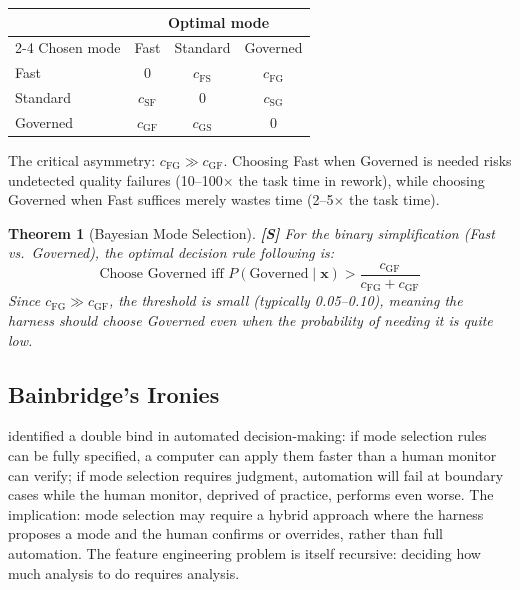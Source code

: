 \documentclass[11pt, a4paper, copyright]{googledeepmind}
\newtheorem{theorem}{Theorem}[section]
\begin{document}
\begin{center}
\begin{tabular}{lccc}
\toprule
& \multicolumn{3}{c}{Optimal mode} \\
\cmidrule(l){2-4}
Chosen mode & Fast & Standard & Governed \\
\midrule
Fast & 0 & $c_{\mathrm{FS}}$ & $c_{\mathrm{FG}}$ \\
Standard & $c_{\mathrm{SF}}$ & 0 & $c_{\mathrm{SG}}$ \\
Governed & $c_{\mathrm{GF}}$ & $c_{\mathrm{GS}}$ & 0 \\
\bottomrule
\end{tabular}
\end{center}

The critical asymmetry: $c_{\mathrm{FG}} \gg c_{\mathrm{GF}}$. Choosing Fast when Governed is needed risks undetected quality failures (10--100$\times$ the task time in rework), while choosing Governed when Fast suffices merely wastes time (2--5$\times$ the task time).

\begin{theorem}[Bayesian Mode Selection]\label{thm:mode}
\textbf{[S]} For the binary simplification (Fast vs.\ Governed), the optimal decision rule following \citet{elkan2001foundations} is:
\[
    \text{Choose Governed iff } P(\text{Governed} \mid \mathbf{x}) > \frac{c_{\mathrm{GF}}}{c_{\mathrm{FG}} + c_{\mathrm{GF}}}
\]
Since $c_{\mathrm{FG}} \gg c_{\mathrm{GF}}$, the threshold is small (typically 0.05--0.10), meaning the harness should choose Governed even when the probability of needing it is quite low.
\end{theorem}

\subsection{Bainbridge's Ironies}

\citet{bainbridge1983ironies} identified a double bind in automated decision-making: if mode selection rules can be fully specified, a computer can apply them faster than a human monitor can verify; if mode selection requires judgment, automation will fail at boundary cases while the human monitor, deprived of practice, performs even worse. The implication: mode selection may require a hybrid approach where the harness proposes a mode and the human confirms or overrides, rather than full automation. The feature engineering problem is itself recursive: deciding how much analysis to do requires analysis.
\end{document}
